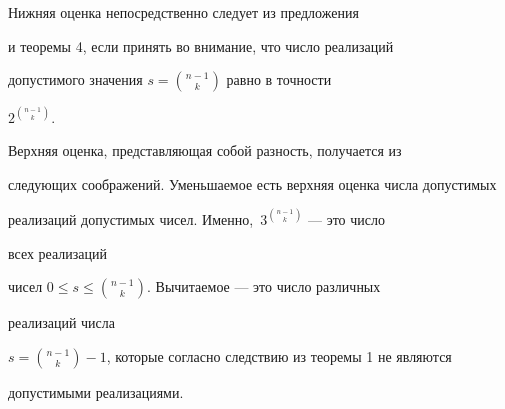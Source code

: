  


\begin{pf} 


Нижняя оценка непосредственно следует из предложения 


и теоремы 4, если принять во внимание, что число реализаций 


допустимого значения $s=\binom{n-1}{k}$ равно в точности 


$2^{\binom{n-1}{k}}$. 


 


Верхняя оценка, представляющая собой разность, получается из 


следующих соображений. Уменьшаемое есть верхняя оценка числа допустимых 


реализаций допустимых чисел. Именно,~$3^{\binom{n-1}{k}}$ --- это число 


всех реализаций 


чисел $0\le s\le\binom{n-1}{k}$. Вычитаемое --- это число различных 


реализаций числа 


$s=\binom{n-1}{k}-1$, которые согласно следствию из теоремы 1 не являются 


допустимыми реализациями. 


\end{pf} 


 


 


